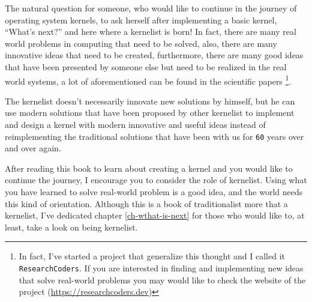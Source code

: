 The natural question for someone, who would like to continue in the
journey of operating system kernels, to ask herself after implementing a
basic kernel, ``What's next?'' and here where a kernelist is born! In
fact, there are many real world problems in computing that need to be
solved, also, there are many innovative ideas that need to be created,
furthermore, there are many good ideas that have been presented by
someone else but need to be realized in the real world systems, a lot of
aforementioned can be found in the scientific papers \footnote{In fact,
  I've started a project that generalize this thought and I called it
  \lstinline!ResearchCoders!. If you are interested in finding and
  implementing new ideas that solve real-world problems you may would
  like to check the website of the project
  (\url{https://researchcoders.dev})}.

The kernelist doesn't necessarily innovate new solutions by himself, but
he can use modern solutions that have been proposed by other kernelist
to implement and design a kernel with modern innovative and useful ideas
instead of reimplementing the traditional solutions that have been with
us for \lstinline!60! years over and over again.

After reading this book to learn about creating a kernel and you would
like to continue the journey, I encourage you to consider the role of
kernelist. Using what you have learned to solve real-world problem is a
good idea, and the world needs this kind of orientation. Although this
is a book of traditionalist more that a kernelist, I've dedicated
chapter \ref{ch-wthat-is-next} for those who would like to, at least,
take a look on being kernelist.
